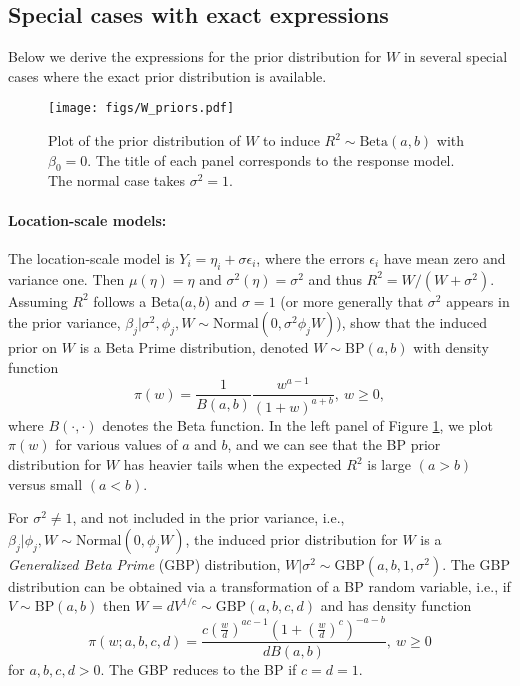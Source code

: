 \documentclass[12pt]{article}
\begin{document}
\subsection{Special cases with exact expressions}\label{s:specialcases}

Below we derive the expressions for the prior distribution for $W$ in several special cases where the exact prior distribution is available.

\begin{figure}
    \centering
    \texttt{[image: figs/W\_priors.pdf]}
    \caption{Plot of the prior distribution of $W$ to induce $R^2\sim\mbox{Beta}(a,b)$ with $\beta_0=0$. The title of each panel corresponds to the response model. The normal case takes $\sigma^2=1$.}
    \label{fig:W_prior}
\end{figure}


\paragraph{Location-scale  models:}%
The location-scale model is $Y_i = \eta_i+\sigma\epsilon_i$, where the errors $\epsilon_i$ have mean zero and variance one. %
Then $\mu(\eta) = \eta$ and $\sigma^2(\eta) = \sigma^2$ and thus $R^2 = W/(W+\sigma^2)$.  Assuming $R^2$ follows a Beta($a,b$) and $\sigma=1$ (or more generally that $\sigma^2$ appears in the prior variance, $\beta_j|\sigma^2,\phi_j,W\sim\mbox{Normal}(0,\sigma^2\phi_jW)$), \cite{zhang2022bayesian} show that the induced prior on $W$ is a Beta Prime distribution, denoted $W\sim\mbox{BP}(a,b)$ with density  function
\begin{equation}
    \pi(w)
    =\frac{1}{B(a,b)}\frac{w^{a-1}}{(1+w)^{a+b}},\ w\geq0,
\end{equation}
where $B(\cdot,\cdot)$ denotes the Beta function.  In the left panel of Figure \ref{fig:W_prior}, we plot $\pi(w)$ for various values of $a$ and $b$, and we can see that the BP prior distribution for $W$ has heavier tails when the expected $R^2$ is large $(a>b)$ versus small $(a<b)$.

For $\sigma^2\ne 1$, and not included in the prior variance, i.e., $\beta_j|\phi_j,W\sim\mbox{Normal}(0,\phi_j W)$, the induced prior distribution for $W$ is a {\it Generalized Beta Prime} (GBP) distribution, $W|\sigma^2\sim\mbox{GBP}(a,b,1,\sigma^2)$. The GBP distribution can be obtained via a transformation of a BP random variable, i.e., if $V\sim\mbox{BP}(a,b)$ then $W=dV^{1/c}\sim\mbox{GBP}(a,b,c,d)$ and has density function
\begin{equation}\label{e:GBP}
    \pi(w;a,b,c,d)
    =\frac{c\left(\frac{w}{d}\right)^{a c-1}\left(1+\left(\frac wd\right)^c\right)^{-a-b}}{dB(a,b)},\ w\geq0
\end{equation}
for $a,b,c,d>0$.  The GBP reduces to the BP if $c=d=1$.
\end{document}
